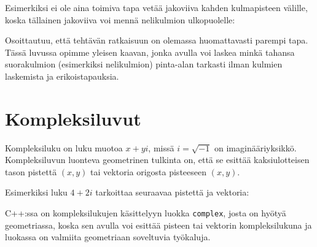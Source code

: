 Esimerkiksi ei ole aina toimiva tapa vetää jakoviiva
kahden kulmapisteen välille, koska tällainen
jakoviiva voi mennä nelikulmion ulkopuolelle:
\begin{center}
\end{center}

Osoittautuu, että tehtävän ratkaisuun on olemassa
huomattavasti parempi tapa.
Tässä luvussa opimme yleisen kaavan,
jonka avulla voi laskea minkä tahansa suorakulmion
(esimerkiksi nelikulmion) pinta-alan tarkasti
ilman kulmien laskemista ja erikoistapauksia.

\section{Kompleksiluvut}

Kompleksiluku on luku muotoa $x+y i$, missä $i = \sqrt{-1}$
on imaginääriyksikkö.
Kompleksiluvun luonteva geometrinen tulkinta on,
että se esittää kaksiulotteisen tason pistettä $(x,y)$
tai vektoria origosta pisteeseen $(x,y)$.

Esimerkiksi luku $4+2i$ tarkoittaa seuraavaa
pistettä ja vektoria:

\begin{center}
\end{center}

C++:ssa on kompleksilukujen käsittelyyn luokka \texttt{complex},
josta on hyötyä geometriassa,
koska sen avulla voi esittää pisteen tai vektorin
kompleksilukuna ja luokassa on valmiita
geometriaan soveltuvia työkaluja.

